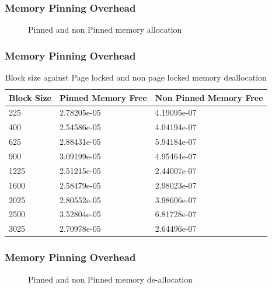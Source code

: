 \documentclass{beamer}
\begin{document}
\begin{frame}[fragile]
  \frametitle{Memory Pinning Overhead}
  \begin{figure}[h]
    \resizebox{.9\linewidth}{!}{}
    \caption{Pinned and non Pinned memory allocation}
  \end{figure}
\end{frame}

\begin{frame}[fragile]
  \frametitle{Memory Pinning Overhead}
  \begin{table}[h]
    \centering
    \begin{tabular}{l<{\onslide<2->} | l<{\onslide<3->} | l<{\onslide}}
      \hline
      Block Size & Pinned Memory Free & Non Pinned Memory Free \\
      \hline
      225        & 2.78205e-05        & 4.19095e-07            \\
      400        & 2.54586e-05        & 4.04194e-07            \\
      625        & 2.88431e-05        & 5.94184e-07            \\
      900        & 3.09199e-05        & 4.95464e-07            \\
      1225       & 2.51215e-05        & 2.44007e-07            \\
      1600       & 2.58479e-05        & 2.98023e-07            \\
      2025       & 2.80552e-05        & 3.98606e-07            \\
      2500       & 3.52804e-05        & 6.81728e-07            \\
      3025       & 2.70978e-05        & 2.64496e-07            \\
      \hline
    \end{tabular}
    \caption{Block size against Page locked and non page locked memory deallocation}
    \label{tab:mempin_free}
  \end{table}
\end{frame}

\begin{frame}[fragile]
  \frametitle{Memory Pinning Overhead}
  \begin{figure}[h]
    \resizebox{.9\linewidth}{!}{}
    \caption{Pinned and non Pinned memory de-allocation}
  \end{figure}
\end{frame}
\end{document}
